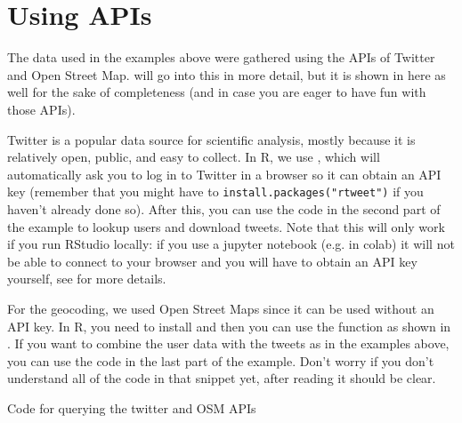 \section{Using APIs}

The data used in the examples above were gathered using the APIs of Twitter and Open Street Map.
 will go into this in more detail, but it is shown in  here as well for the sake of completeness
(and in case you are eager to have fun with those APIs).

Twitter is a popular data source for scientific analysis, mostly because it is relatively open, public, and easy to collect.
In R, we use , which will automatically ask you to log in to Twitter in a browser so it can obtain an API key
(remember that you might have to \verb|install.packages("rtweet")| if you haven't already done so).
After this, you can use the code in the second part of the example to lookup users and download tweets.
Note that this will only work if you run RStudio locally: if you use a jupyter notebook (e.g. in colab)
it will not be able to connect to your browser and you will have to obtain an API key yourself,
see  for more details. 

For the geocoding, we used Open Street Maps since it can be used without an API key.
In R, you need to install  and then you can use the  function as shown in .
If you want to combine the user data with the tweets as in the examples above,
you can use the code in the last part of the example. 
Don't worry if you don't understand all of the code in that snippet yet,
after reading  it should be clear. 



\begin{ccsexample}
  \caption{Code for querying the twitter and OSM APIs}\label{ex:funapi}
  
\end{ccsexample}
